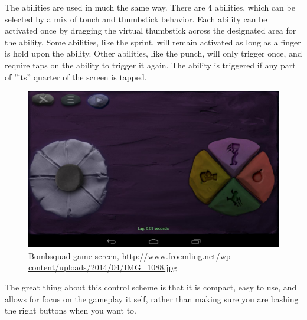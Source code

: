 The abilities are used in much the same way. 
There are 4 abilities, which can be selected by a mix of touch and thumbstick behavior. 
Each ability can be activated once by dragging the virtual thumbstick across the designated area for the ability. 
Some abilities, like the sprint, will remain activated as long as a finger is hold upon the ability. 
Other abilities, like the punch, will only trigger once, and require taps on the ability to trigger it again. 
The ability is triggered if any part of ''its'' quarter of the screen is tapped.

\begin{figure}[H]
\centering
\includegraphics[width=1\textwidth]{figures/controlscheme/onscreen_control}
\caption{Bombsquad game screen, \url{http://www.froemling.net/wp-content/uploads/2014/04/IMG_1088.jpg}}
\end{figure}

The great thing about this control scheme is that it is compact, easy to use, and allows for focus on the gameplay it self, rather than making sure you are bashing the right buttons when you want to.

